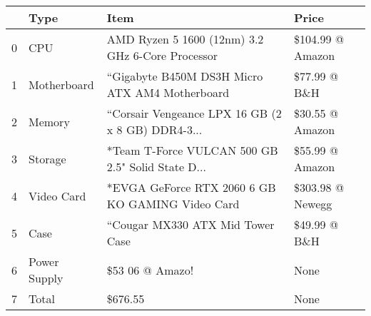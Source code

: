 \begin{tabular}{llll}
\toprule
{} &          Type &                                               Item &             Price \\
\midrule
0 &           CPU &   AMD Ryzen 5 1600 (12nm) 3.2 GHz 6-Core Processor &  \$104.99 @ Amazon \\
1 &   Motherboard &     “Gigabyte B450M DS3H Micro ATX AM4 Motherboard &      \$77.99 @ B\&H \\
2 &        Memory &  “Corsair Vengeance LPX 16 GB (2 x 8 GB) DDR4-3... &   \$30.55 @ Amazon \\
3 &       Storage &  *Team T-Force VULCAN 500 GB 2.5" Solid State D... &   \$55.99 @ Amazon \\
4 &    Video Card &   *EVGA GeForce RTX 2060 6 GB KO GAMING Video Card &  \$303.98 @ Newegg \\
5 &          Case &                   “Cougar MX330 ATX Mid Tower Case &      \$49.99 @ B\&H \\
6 &  Power Supply &                                    \$53 06 @ Amazo! &              None \\
7 &         Total &                                            \$676.55 &              None \\
\bottomrule
\end{tabular}
